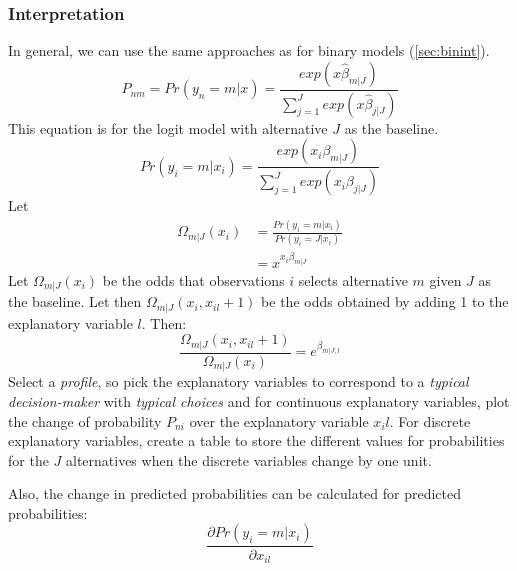 		\subsubsection{Interpretation}
			In general, we can use the same approaches as for binary models (\ref{sec:binint}).
				\begin{equation*}
					P_{nm}=\hat{Pr}(y_n=m|x)=\frac{exp(x\hat{\beta}_{m|J})}{\sum\limits^J_{j=1}exp(x\hat{\beta}_{j|J})}
				\end{equation*}
				This equation is for the logit model with alternative $J$ as the baseline.
				\begin{equation*}
					Pr(y_i=m|x_i)=\frac{exp(x_i \beta_{m|J})}{\sum\limits^J_{j=1}exp(x_i \beta_{j|J})}
				\end{equation*}
				Let
				\begin{align*}
					\Omega_{m|J}(x_i)&=\frac{Pr(y_i=m|x_i)}{Pr(y_i=J|x_i)}\\
					&=x^{x_i \beta_{m|J}}
				\end{align*}
				Let $\Omega_{m|J}(x_i)$ be the odds that observations $i$ selects alternative $m$ given $J$ as the baseline. Let then $\Omega_{m|J}(x_i,x_{il}+1)$ be the odds obtained by adding 1 to the explanatory variable $l$. Then:
				\begin{equation*}
					\frac{\Omega_{m|J}(x_i,x_{il}+1)}{\Omega_{m|J}(x_i)}=e^{\beta_{m|J,l}}
				\end{equation*}
				Select a \textit{profile}, so pick the explanatory variables to correspond to a \textit{typical decision-maker} with \textit{typical choices} and for continuous explanatory variables, plot the change of probability $P_{ni}$ over the explanatory variable $x_il$. For discrete explanatory variables, create a table to store the different values for probabilities for the $J$ alternatives when the discrete variables change by one unit.
				
				Also, the change in predicted probabilities can be calculated for predicted probabilities:
				\begin{equation*}
					\frac{\partial Pr(y_i=m|x_i)}{\partial x_{il}}
				\end{equation*}
